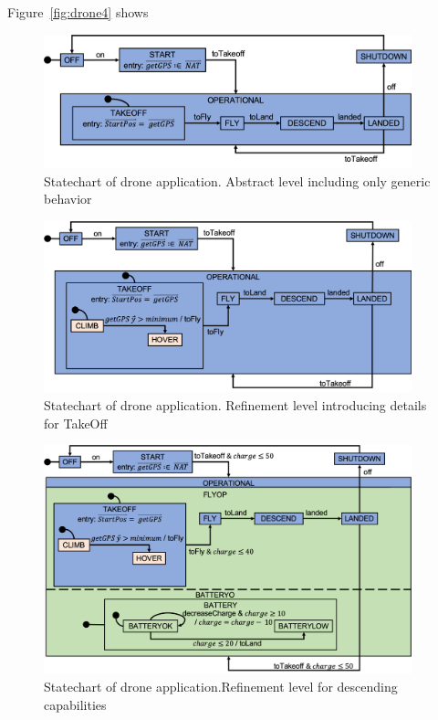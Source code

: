 Figure~\ref{fig:drone4} shows

\begin{figure}[!h]
	\vspace{-.4cm}
	\centering
	\includegraphics[width=0.95\textwidth]{figures/Picture1.png}
	\caption{Statechart of drone application. Abstract level including only generic behavior }
	\label{fig:drone1}
	\vspace{-.4cm}
\end{figure} 

\begin{figure}[!h]
	\centering
	\includegraphics[width=0.95\textwidth]{figures/Picture2.png}
	\caption{Statechart of drone application. Refinement level introducing details for TakeOff}
	\label{fig:drone2}
\end{figure} 

\begin{figure}[!h]
	\centering
	\includegraphics[width=0.95\textwidth]{figures/Picture3.png}
	\caption{Statechart of drone application.Refinement level for descending capabilities}
	\label{fig:drone3}
\end{figure} 

